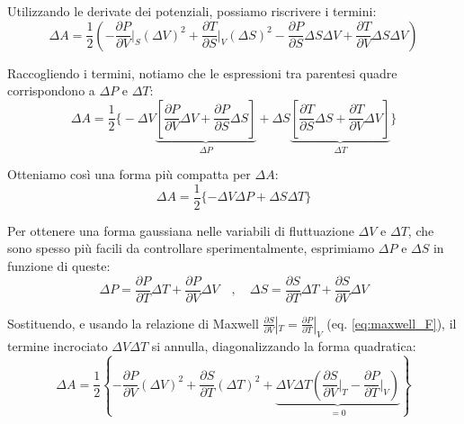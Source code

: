 Utilizzando le derivate dei potenziali, possiamo riscrivere i termini:
\begin{equation}
    \Delta A = \frac{1}{2}\left(-\frac{\partial P}{\partial V}\bigg|_{S}(\Delta V)^{2}+\frac{\partial T}{\partial S}\bigg|_{V}(\Delta S)^{2}-\frac{\partial P}{\partial S}\Delta S\Delta V+ \frac{\partial T}{\partial V}\Delta S\Delta V\right)
    \label{eq:delta_A_derivate}
\end{equation}

Raccogliendo i termini, notiamo che le espressioni tra parentesi quadre corrispondono a $\Delta P$ e $\Delta T$:
\begin{equation}
    \Delta A = \frac{1}{2}\bigg\{-\Delta V\underbrace{\left[\frac{\partial P}{\partial V}\Delta V+\frac{\partial P}{\partial S}\Delta S\right]}_{\Delta P}+\Delta S\underbrace{\left[\frac{\partial T}{\partial S}\Delta S+\frac{\partial T}{\partial V}\Delta V\right]}_{\Delta T}\bigg\}
    \label{eq:delta_A_raccolto}
\end{equation}

Otteniamo così una forma più compatta per $\Delta A$:
\begin{equation}
    \Delta A=\frac{1}{2}\{-\Delta V\Delta P+\Delta S\Delta T\}
    \label{eq:delta_A_compatto}
\end{equation}

Per ottenere una forma gaussiana nelle variabili di fluttuazione $\Delta V$ e $\Delta T$, che sono spesso più facili da controllare sperimentalmente, esprimiamo $\Delta P$ e $\Delta S$ in funzione di queste:
\begin{equation}
    \Delta P=\frac{\partial P}{\partial T}\Delta T+\frac{\partial P}{\partial V}\Delta V \quad , \quad \Delta S=\frac{\partial S}{\partial T}\Delta T+\frac{\partial S}{\partial V}\Delta V
    \label{eq:delta_P_S}
\end{equation}

Sostituendo, e usando la relazione di Maxwell $\frac{\partial S}{\partial V}|_T = \frac{\partial P}{\partial T}|_V$ (eq. \ref{eq:maxwell_F}), il termine incrociato $\Delta V \Delta T$ si annulla, diagonalizzando la forma quadratica:
\begin{equation}
    \Delta A=\frac{1}{2}\left\{-\frac{\partial P}{\partial V}(\Delta V)^{2}+\frac{\partial S}{\partial T}(\Delta T)^{2}+\underbrace{\Delta V\Delta T\left(\frac{\partial S}{\partial V}\bigg|_{T}-\frac{\partial P}{\partial T}\bigg|_{V}\right)}_{=0}\right\}
    \label{eq:delta_A_diagonale}
\end{equation}

